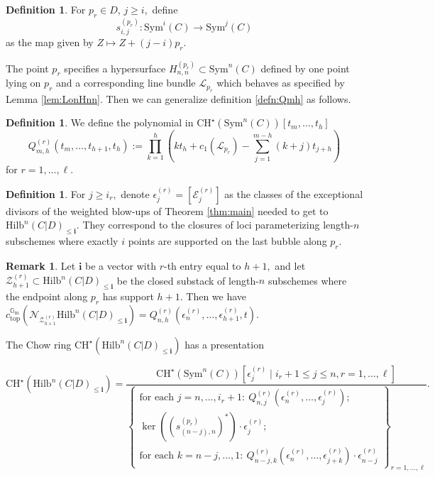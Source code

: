 \documentclass[10.5pt]{amsart}
\theoremstyle{definition}
\newenvironment{customthm}[1]
  {\renewcommand\theinnercustomthm{#1}\innercustomthm}
  {\endinnercustomthm}
\theoremstyle{definition}
\theoremstyle{definition}
\theoremstyle{definition}
\newtheorem{remark}[theorem]{Remark}
\newtheorem{definition}[theorem]{Definition}
\newcommand{\Gm}{\mathbb{G}_{\operatorname{m}}}
\newcommand{\Hilb}{\mathrm{Hilb}}
\newcommand{\Sym}{\mathrm{Sym}}
\newcommand{\ra}{\rightarrow}
\newcommand{\CHs}{\mathrm{CH}^\star}
\newcommand{\cZ}{\mathcal{Z}}
\newcommand{\cE}{\mathcal{E}}
\newcommand{\cN}{\mathcal{N}}
\newcommand{\cL}{\mathcal{L}}
\newcommand{\bi}{\boldsymbol{i}}
\begin{document}
\begin{definition}\label{defn:sij}
    For $p_r \in D$, $j\geq i,$ define $$s_{i,j}^{(p_r)}: \Sym^i(C) \ra \Sym^j(C)$$ as the map given by $Z\mapsto Z + (j-i)p_r.$
\end{definition}

The point $p_r$ specifies a hypersurface $H_{n,n}^{(p_r)}\subset \Sym^n(C)$ defined by one point lying on $p_r$ and a corresponding line bundle $\cL_{p_r}$ which behaves as specified by Lemma \ref{lem:LonHnn}. Then we can generalize definition \ref{defn:Qmh} as follows.
 
 \begin{definition} We define the polynomial in $\CHs(\Sym^n(C))[t_m,\dots,t_h]$
 $$Q_{m,h}^{(r)}(t_{m},\dots,t_{h+1},t_h) :=\prod_{k=1}^h (kt_h + c_1(\mathcal{L}_{p_r})-\sum_{j=1}^{m-h}(k+j)t_{j+h})$$ for $r = 1,\dots, \ell$.
\end{definition}

\begin{definition}
    For $j\ge i_r,$ denote $\epsilon_j^{(r)}=[\cE_j^{(r)}]$ as the classes of the exceptional divisors of the weighted blow-ups of Theorem \ref{thm:main} needed to get to $\Hilb^n(C|D)_{\leq \bi}$. They correspond to the {closures of} loci parameterizing length-$n$ subschemes where exactly $i$ points are supported on the last bubble along $p_r$.
\end{definition}

\begin{remark}
    Let $\bi$ be a vector with $r$-th entry equal to $h+1,$ and let $\cZ^{(r)}_{h+1}\subset \Hilb^n(C|D)_{\leq \bi}$ be the closed substack of length-$n$ subschemes where the endpoint along $p_r$ has support $h+1.$ Then we have $c^{\Gm}_{\mathrm{top}}(\cN_{\cZ^{(r)}_{h+1}} \Hilb^n(C|D)_{\leq \bi}) = Q_{n,h}^{(r)}(\epsilon^{(r)}_n, \dots, \epsilon^{(r)}_{h+1}, t).$
\end{remark}


\begin{customthm}{D}\label{thm:chowringD}
    The Chow ring $\mathrm{CH}^\star(\Hilb^n(C|D)_{\leq \bi})$ has a presentation 
  
  $$\mathrm{CH}^\star(\Hilb^n(C|D)_{\leq \bi}) = \frac{\mathrm{CH}^\star(\mathrm{Sym}^n(C))[\epsilon^{(r)}_{j}\mid i_r+1\leq j\leq n, r = 1,\dots, \ell]}{\left\{\begin{array}{c}
   \text{for each }j = n, \dots, i_r+1:\  Q_{n,j}^{(r)}(\epsilon^{(r)}_{n},\dots,\epsilon^{(r)}_{j}); \\ \ker({(s^{(p_r)}_{(n-j), n})}^*) \cdot \epsilon^{(r)}_{j};\\ \text{for each }k = n-j, \dots, 1: \ Q_{n-j,k}^{(r)}(\epsilon^{(r)}_{n},\dots, \epsilon^{(r)}_{j+k})\cdot\epsilon^{(r)}_{n-j} 
  \end{array}\right\}_{r = 1,\dots, \ell}}.$$
\end{customthm}
\end{document}
